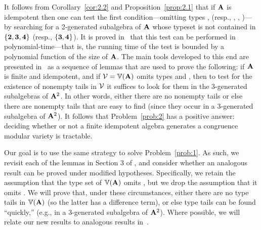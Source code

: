 \documentclass{ws-ijac}
\begin{document}
It follows from Corollary~\ref{cor:2.2} and Proposition~\ref{prop:2.1}
that if $\mathbf{A}$ is idempotent then one can
test the first condition---omitting
types \utyp, \styp (resp., \utyp, \atyp, \styp)---by searching
for a 2-generated subalgebra of $\mathbf{A}$ whose typeset is
not contained in
$\{\textbf{2}, \textbf{3}, \textbf{4}\}$ (resp., $\{\textbf{3}, \textbf{4}\}$). It is proved
in~\cite[Section~6]{Freese:2009} that this
test can be performed in polynomial-time---that is, the running
time of the test is bounded by a polynomial function of the size of $\mathbf{A}$.
The main tools developed to this end are presented
in~\cite[Section~3]{Freese:2009} as a sequence of
lemmas that are used %
to prove the following:
if $\mathbf{A}$ is finite and idempotent, and if
$\mathcal V = \operatorname{\mathbb{V}}(\mathbf{A})$ omits types \utyp and \styp,
then to test for the existence of nonempty tails
in $\mathcal{V}$ it suffices to look for them
in the 3-generated subalgebras of $\mathbf{A}^2$.
In other words, either there are no nonempty tails
or else there are nonempty tails that are easy to find
(since they occur in a 3-generated subalgebra of $\mathbf{A}^2$).
It follows that Problem~\ref{prob:2} has a positive answer:
deciding whether or not a finite idempotent algebra generates a congruence
modular variety is tractable.%

Our goal is to use the same strategy to solve Problem~\ref{prob:1}.
As such, we revisit each of the lemmas in Section 3 of \cite{Freese:2009},
and consider whether an analogous result can be proved under
modified hypotheses.
Specifically, we retain the assumption that the type set of $\operatorname{\mathbb{V}}(\mathbf{A})$
omits \utyp, but we drop the assumption that it omits \styp.
We will  prove that, under these circumstances, %
either there are no type \atyp tails in $\operatorname{\mathbb{V}}(\mathbf{A})$ (so the latter has a difference term),
or else type \atyp tails can be found ``quickly,''
(e.g., in a 3-generated subalgebra of $\mathbf{A}^2$).
Where possible, we will relate our new results to
analogous results in~\cite{Freese:2009}.
\end{document}
